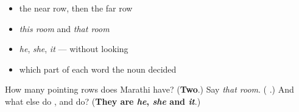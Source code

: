 \begin{itemize}
\raggedright
  \item the near row, then the far row
  \item \emph{this room} and \emph{that room}
  \item \emph{he}, \emph{she}, \emph{it} — without looking
  \item which part of each word the noun decided
\end{itemize}

\begin{tcolorbox}[breakable,colback=teal!4,colframe=teal!35!black,title={Before you move on}]
How many pointing rows does Marathi have? (\textbf{Two}.) Say \emph{that room}. (\emph{\textbf{ }}.) And what else do ,  and  do? (\textbf{They are \emph{he}, \emph{she} and \emph{it}}.)
\end{tcolorbox}
